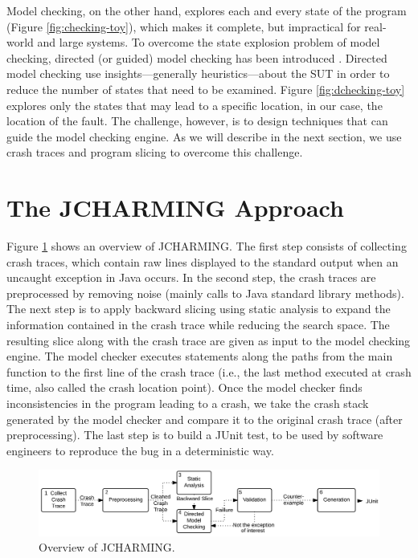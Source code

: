 \documentclass[times]{smrauth}
\begin{document}
Model checking, on the other hand, explores each and every state of the program (Figure \ref{fig:checking-toy}), which makes it complete, but impractical for real-world and large systems. To overcome the state explosion problem of model checking, directed (or guided) model checking has been introduced \cite{Rungta2009}. Directed model checking use insights—generally heuristics—about the SUT in order to reduce the number of states that need to be examined. Figure \ref{fig:dchecking-toy} explores only the states that may lead to a specific location, in our case, the location of the fault. The challenge, however, is to design techniques that can guide the model checking engine. As we will describe in the next section, we use crash traces and program slicing to overcome this challenge.

\section{The JCHARMING Approach\label{sec:jcharming}}

Figure \ref{fig:jcarming-approach} shows an overview of JCHARMING. The first step
consists of collecting crash traces, which contain raw lines
displayed to the standard output when an uncaught exception
in Java occurs. In the second step, the crash traces are
preprocessed by removing noise (mainly calls to Java standard
library methods). The next step is to apply backward slicing
using static analysis to expand the information contained in
the crash trace while reducing the search space. The resulting
slice along with the crash trace are given as input to the model
checking engine. The model checker executes statements
along the paths from the main function to the first line of the
crash trace (i.e., the last method executed at crash time, also
called the crash location point). Once the model checker finds
inconsistencies in the program leading to a crash, we take the
crash stack generated by the model checker and compare it to
the original crash trace (after preprocessing). The last step is
to build a JUnit test, to be used by software engineers to
reproduce the bug in a deterministic way.

\begin{figure}[h!]
  \centering
    \includegraphics[scale=0.8]{media/jcharming-approach.png}
    \caption{Overview of JCHARMING.
    \label{fig:jcarming-approach}}
\end{figure}
\end{document}
